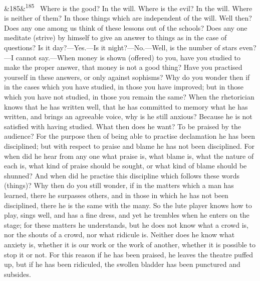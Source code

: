 \documentclass[12pt]{article}
\newcommand{\para}[1][]{\par\noindent\ifx&#1&\else\textsuperscript{\footnotesize #1}~\fi}
\begin{document}
\para[185] Where is the good? In the will. Where is the evil? In the will. Where is neither of them? In those things which are independent of the will. Well then? Does any one among us think of these lessons out of the schools? Does any one meditate (strive) by himself to give an answer to things as in the case of questions? Is it day?—Yes.—Is it night?—No.—Well, is the number of stars even?—I cannot say.—When money is shown (offered) to you, have you studied to make the proper answer, that money is not a good thing? Have you practised yourself in these answers, or only against sophisms? Why do you wonder then if in the cases which you have studied, in those you have improved; but in those which you have not studied, in those you remain the same? When the rhetorician knows that he has written well, that he has committed to memory what he has written, and brings an agreeable voice, why is he still anxious? Because he is not satisfied with having studied. What then does he want? To be praised by the audience? For the purpose then of being able to practise declamation he has been disciplined; but with respect to praise and blame he has not been disciplined. For when did he hear from any one what praise is, what blame is, what the nature of each is, what kind of praise should be sought, or what kind of blame should be shunned? And when did he practise this discipline which follows these words (things)? Why then do you still wonder, if in the matters which a man has learned, there he surpasses others, and in those in which he has not been disciplined, there he is the same with the many. So the lute player knows how to play, sings well, and has a fine dress, and yet he trembles when he enters on the stage; for these matters he understands, but he does not know what a crowd is, nor the shouts of a crowd, nor what ridicule is. Neither does he know what anxiety is, whether it is our work or the work of another, whether it is possible to stop it or not. For this reason if he has been praised, he leaves the theatre puffed up, but if he has been ridiculed, the swollen bladder has been punctured and subsides.
\end{document}
